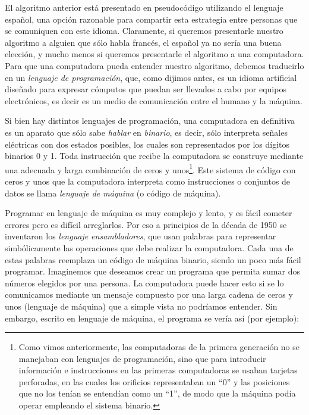 \documentclass[
]{book}
\begin{document}
El algoritmo anterior está presentado en pseudocódigo utilizando el lenguaje español, una opción razonable para compartir esta estrategia entre personas que se comuniquen con este idioma. Claramente, si queremos presentarle nuestro algoritmo a alguien que sólo habla francés, el español ya no sería una buena elección, y mucho menos si queremos presentarle el algoritmo a una computadora. Para que una computadora pueda entender nuestro algoritmo, debemos traducirlo en un \emph{lenguaje de programación}, que, como dijimos antes, es un idioma artificial diseñado para expresar cómputos que puedan ser llevados a cabo por equipos electrónicos, es decir es un medio de comunicación entre el humano y la máquina.

Si bien hay distintos lenguajes de programación, una computadora en definitiva es un aparato que sólo sabe \emph{hablar} en \emph{binario}, es decir, sólo interpreta señales eléctricas con dos estados posibles, los cuales son representados por los dígitos binarios 0 y 1. Toda instrucción que recibe la computadora se construye mediante una adecuada y larga combinación de ceros y unos\footnote{Como vimos anteriormente, las computadoras de la primera generación no se manejaban con lenguajes de programación, sino que para introducir información e instrucciones en las primeras computadoras se usaban tarjetas perforadas, en las cuales los orificios representaban un ``0'' y las posiciones que no los tenían se entendían como un ``1'', de modo que la máquina podía operar empleando el sistema binario.}. Este sistema de código con ceros y unos que la computadora interpreta como instrucciones o conjuntos de datos se llama \emph{lenguaje de máquina} (o código de máquina).

Programar en lenguaje de máquina es muy complejo y lento, y es fácil cometer errores pero es difícil arreglarlos. Por eso a principios de la década de 1950 se inventaron los \emph{lenguaje ensambladores}, que usan palabras para representar simbólicamente las operaciones que debe realizar la computadora. Cada una de estas palabras reemplaza un código de máquina binario, siendo un poco más fácil programar. Imaginemos que deseamos crear un programa que permita sumar dos números elegidos por una persona. La computadora puede hacer esto si se lo comunicamos mediante un mensaje compuesto por una larga cadena de ceros y unos (lenguaje de máquina) que a simple vista no podríamos entender. Sin embargo, escrito en lenguaje de máquina, el programa se vería así (por ejemplo):
\end{document}
